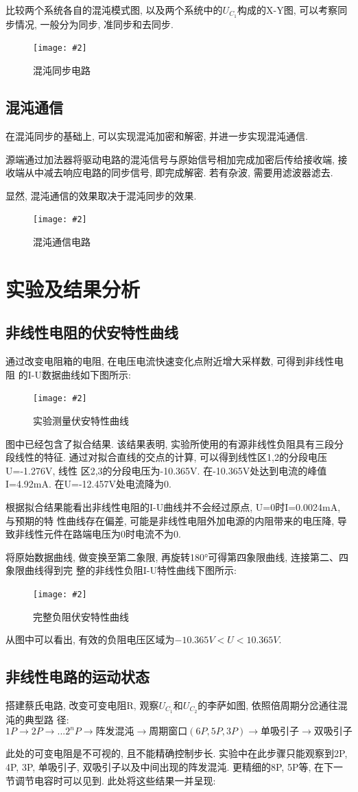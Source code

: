 \documentclass[12pt,a4paper]{article}
\newcommand{\bfig}[3]{
    \begin{figure}[H]
        \centering
        \texttt{[image: \#2]}
        \caption{#3}
    \end{figure}
}
\begin{document}
比较两个系统各自的混沌模式图, 以及两个系统中的$U_{C_1}$构成的X-Y图, 可以考察同步情况, 一般分为同步, 准同步和去同步. 
\bfig{0.7}{混沌同步电路.png}{混沌同步电路}

\subsection{混沌通信}
在混沌同步的基础上, 可以实现混沌加密和解密, 并进一步实现混沌通信. 

源端通过加法器将驱动电路的混沌信号与原始信号相加完成加密后传给接收端, 接收端从中减去响应电路的同步信号, 即完成解密. 若有杂波, 需要用滤波器滤去. 

显然, 混沌通信的效果取决于混沌同步的效果. 
\bfig{0.7}{混沌通信电路.png}{混沌通信电路}
\section{实验及结果分析}
\subsection{非线性电阻的伏安特性曲线}
通过改变电阻箱的电阻, 在电压电流快速变化点附近增大采样数, 可得到非线性电阻
的I-U数据曲线如下图所示:
\bfig{0.8}{IU1.png}{实验测量伏安特性曲线}
图中已经包含了拟合结果. 该结果表明, 实验所使用的有源非线性负阻具有三段分段线性的特征. 通过对拟合直线的交点的计算, 可以得到线性区1,2的分段电压U=-1.276V, 线性
区2,3的分段电压为-10.365V. 在-10.365V处达到电流的峰值I=4.92mA. 在U=-12.457V处电流降为0. 

根据拟合结果能看出非线性电阻的I-U曲线并不会经过原点, U=0时I=0.0024mA, 与预期的特
性曲线存在偏差, 可能是非线性电阻外加电源的内阻带来的电压降, 导致非线性元件在路端电压为0时电流不为0. 

将原始数据曲线, 做变换至第二象限, 再旋转180°可得第四象限曲线, 连接第二、四象限曲线得到完
整的非线性负阻I-U特性曲线下图所示: 
\bfig{0.8}{IU2.png}{完整负阻伏安特性曲线}
从图中可以看出, 有效的负阻电压区域为$-10.365V<U<10.365V$. 

\subsection{非线性电路的运动状态}
搭建蔡氏电路, 改变可变电阻R, 观察$U_{C_1}$和$U_{C_2}$的李萨如图, 依照倍周期分岔通往混沌的典型路
径:
$$1P\rightarrow 2P \rightarrow ... 2^n P \rightarrow \text{阵发混沌} \rightarrow \text{周期窗口}(6P,5P,3P)\rightarrow \text{单吸引子}\rightarrow \text{双吸引子}$$

此处的可变电阻是不可视的, 且不能精确控制步长. 实验中在此步骤只能观察到2P, 4P, 3P, 单吸引子, 双吸引子以及中间出现的阵发混沌. 更精细的8P, 5P等, 在下一节调节电容时可以见到. 此处将这些结果一并呈现:
\end{document}
